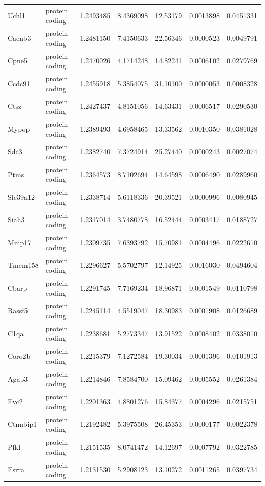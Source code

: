 \documentclass[onehalf,12pt]{beavtex}
\begin{document}
\begin{longtable}{llrrrrr}
  Uchl1 & protein coding & 1.2493485 & 8.4369098 & 12.53179 & 0.0013898 & 0.0451331\\
  Cacnb3 & protein coding & 1.2481150 & 7.4150633 & 22.56346 & 0.0000523 & 0.0049791\\
  Cpne5 & protein coding & 1.2470026 & 4.1714248 & 14.82241 & 0.0006102 & 0.0279769\\
  Ccdc91 & protein coding & 1.2455918 & 5.3854075 & 31.10100 & 0.0000053 & 0.0008328\\
  \addlinespace
  Ctsz & protein coding & 1.2427437 & 4.8151056 & 14.63431 & 0.0006517 & 0.0290530\\
  Mypop & protein coding & 1.2389493 & 4.6958465 & 13.33562 & 0.0010350 & 0.0381028\\
  Sdc3 & protein coding & 1.2382740 & 7.3724914 & 25.27440 & 0.0000243 & 0.0027074\\
  Ptms & protein coding & 1.2364573 & 8.7102694 & 14.64598 & 0.0006490 & 0.0289960\\
  Slc39a12 & protein coding & -1.2338714 & 5.6118336 & 20.39521 & 0.0000996 & 0.0080945\\
  \addlinespace
  Siah3 & protein coding & 1.2317014 & 3.7480778 & 16.52444 & 0.0003417 & 0.0188727\\
  Mmp17 & protein coding & 1.2309735 & 7.6393792 & 15.70981 & 0.0004496 & 0.0222610\\
  Tmem158 & protein coding & 1.2296627 & 5.5702797 & 12.14925 & 0.0016030 & 0.0494604\\
  Cbarp & protein coding & 1.2291745 & 7.7169234 & 18.96871 & 0.0001549 & 0.0110798\\
  Rassf5 & protein coding & 1.2245114 & 4.5519047 & 18.30983 & 0.0001908 & 0.0126689\\
  \addlinespace
  C1qa & protein coding & 1.2238681 & 5.2773347 & 13.91522 & 0.0008402 & 0.0338010\\
  Coro2b & protein coding & 1.2215379 & 7.1272584 & 19.30034 & 0.0001396 & 0.0101913\\
  Agap3 & protein coding & 1.2214846 & 7.8584700 & 15.09462 & 0.0005552 & 0.0261384\\
  Evc2 & protein coding & 1.2201363 & 4.8801276 & 15.84377 & 0.0004296 & 0.0215751\\
  Ctnnbip1 & protein coding & 1.2192482 & 5.3975508 & 26.45353 & 0.0000177 & 0.0022378\\
  \addlinespace
  Pfkl & protein coding & 1.2151535 & 8.0741472 & 14.12697 & 0.0007792 & 0.0322785\\
  Esrra & protein coding & 1.2131530 & 5.2908123 & 13.10272 & 0.0011265 & 0.0397734\\

\end{longtable}
\end{document}
